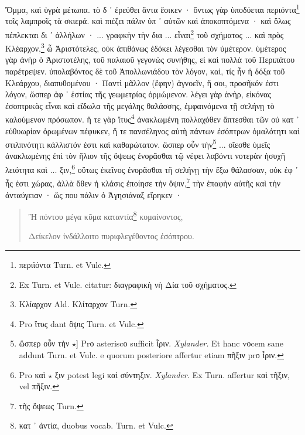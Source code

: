 \documentclass[a4paper, 11pt, oneside, polutonikogreek, german]{article}
\begin{document}
Ὄμμα, καὶ ὑγρὰ μέτωπα. τὸ δ ᾽ ἐρεύθει ἄντα ἔοικεν · ὄντως γὰρ ὑποδύεται περιόντα\footnote{περιϊόντα Turn. et Vulc.} τοῖς λαμπροῖς τὰ σκιερά. καὶ πιέζει πάλιν ὑπ ᾽ αὐτῶν καὶ ἀποκοπτόμενα · καὶ ὅλως πέπλεκται δι ᾽ ἀλλήλων · ... γραφκὴν τὴν δια ... εἶναι\footnote{Ex Turn. et Vulc. citatur: διαγραφικὴ νὴ Δία τοῦ σχήματος.} τοῦ σχήματος ... καὶ πρὸς Κλέαρχον,\footnote{Κλίαρχον Ald. Κλίταρχον Turn.} ὦ Ἀριστότελες, οὐκ ἀπιθάνως ἐδόκει λέγεσθαι τὸν ὑμέτερον. ὑμέτερος γὰρ ἀνὴρ ὁ Ἀριστοτέλης, τοῦ παλαιοῦ γεγονὼς συνήθης, εἰ καὶ πολλὰ τοῦ Περιπάτου παρέτρεψεν. ὑπολαβόντος δὲ τοῦ Ἀπολλωνιάδου τὸν λόγον, καὶ, τίς ἦν ἡ δόξα τοῦ Κλεάρχου, διαπυθομένου · Παντὶ μᾶλλον (ἔφην) ἀγνοεῖν, ἤ σοι, προσῆκόν ἐστι λόγον, ὥσπερ ἀφ ᾽ ἑστίας τῆς γεωμετρίας ὁρμώμενον. λέγει γὰρ ἀνὴρ, εἰκόνας ἐσοπτρικὰς εἶναι καὶ εἴδωλα τῆς μεγάλης θαλάσσης, ἐμφαινόμενα τῇ σελήνῃ τὸ καλούμενον πρόσωπον. ἥ τε γὰρ ἴτυς\footnote{Pro ἴτυς dant ὂψις Turn. et Vulc.} ἀνακλωμένη πολλαχόθεν ἅπτεσθαι τῶν οὐ κατ ᾽ εὐθυωρίαν ὁρωμένων πέφυκεν, ἥ τε πανσέληνος αὐτὴ πάντων ἐσόπτρων ὁμαλότητι καὶ στιλπνότητι κάλλιστόν ἐστι καὶ καθαρώτατον. ὥσπερ οὖν τὴν\footnote{ὥσπερ οὖν τὴν $\star$] Prο asteriscο sufficit ἶριν. \emph{Xylander.} Et hanc vοcem sane addunt Turn. et Vulc. e quorum posteriore affertur etiam πῆξιν prο ἶριν.} ... οἴεσθε ὑμεῖς ἀνακλωμένης ἐπὶ τὸν ἥλιον τῆς ὄψεως ἐνορᾶσθαι τῷ νέφει λαβόντι νοτερὰν ἡσυχῆ λειότητα καὶ ... ξιν,\footnote{Pro καὶ $\star$ ξιν potest legi καὶ σύντηξιν. \emph{Xylander.} Ex Turn. affertur καὶ τῆξιν, vel πῆξιν.} οὕτως ἐκεῖνος ἐνορᾶσθαι τῆ σελήνῃ τὴν ἔξω θάλασσαν, οὐκ ἐφ ᾽ ἧς ἐστι χώρας, ἀλλὰ ὅθεν ἡ κλάσις ἐποίησε τὴν ὄψιν,\footnote{τῆς ὄψεως Turn.} τὴν ἐπαφὴν αὑτῆς καὶ τὴν ἀνταύγειαν · ὥς που πάλιν ὁ Ἀγησιάναξ εἴρηκεν ·
\begin{quotation}
Ἢ πόντου μέγα κῦμα καταντία\footnote{κατ ᾽ ἀντία, duobus vocab. Turn. et Vulc.} κυμαίνοντος,

Δείκελον ἰνδάλλοιτο πυριφλεγέθοντος ἐσόπτρου.
\end{quotation}
\end{document}
